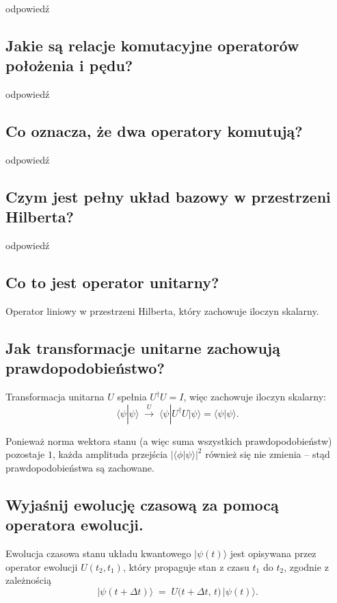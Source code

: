 odpowiedź

\subsection{Jakie są relacje komutacyjne operatorów położenia i pędu?}

odpowiedź

\subsection{Co oznacza, że dwa operatory komutują?}

odpowiedź

\subsection{Czym jest pełny układ bazowy w przestrzeni Hilberta?}

odpowiedź

\subsection{Co to jest operator unitarny?}

Operator liniowy w przestrzeni Hilberta, który zachowuje iloczyn skalarny.

\subsection{Jak transformacje unitarne zachowują prawdopodobieństwo?}

Transformacja unitarna $U$ spełnia $U^\dagger U = I$, więc zachowuje iloczyn skalarny:
\[
\langle \psi | \psi \rangle
\;\xrightarrow{\,U\,}\;
\langle \psi | U^\dagger U | \psi \rangle
= \langle \psi | \psi \rangle.
\]

Ponieważ norma wektora stanu (a więc suma wszystkich prawdopodobieństw) pozostaje $1$, każda amplituda przejścia 
$|\langle \phi | \psi \rangle|^{2}$ również się nie zmienia – stąd prawdopodobieństwa są zachowane.

\subsection{Wyjaśnij ewolucję czasową za pomocą operatora ewolucji.}

Ewolucja czasowa stanu układu kwantowego \(\lvert \psi(t) \rangle\) jest opisywana przez operator ewolucji \(U(t_{2},t_{1})\), który propaguje stan z czasu \(t_{1}\) do \(t_{2}\), zgodnie z zależnością
\[
\lvert \psi(t+\Delta t) \rangle \;=\; U\bigl(t+\Delta t,\,t\bigr)\,\lvert \psi(t) \rangle.
\]

